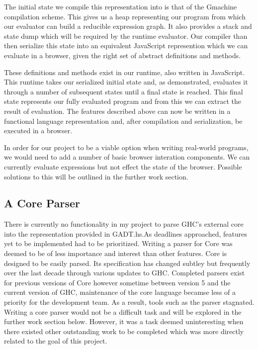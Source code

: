 The initial state we compile this representation into is that of
the Gmachine compilation scheme. This gives us a heap representing
our program from which our evaluator can build a reducible expression
graph. It also provides a stack and state dump which will be 
required by the runtime evaluator. Our compiler than then serialize
this state into an equivalent JavaScript represention which we can
evaluate in a browser, given the right set of abstract definitions
and methods.

These definitions and methods exist in our runtime, also written
in JavaScript. This runtime takes our serialized initial state
and, as demonstrated, evaluates it through a number of subsequent
states until a final state is reached. This final state represents
our fully evaluated program and from this we can extract the result
of evaluation. The features described above can now be written
in a functional language representation and, after compilation
and serialization, be executed in a browser. 

In order for our project to be a viable option when writing 
real-world programs, we would need to add a number of basic browser
interation components. We can currently evaluate expressions but
not effect the state of the browser. Possible solutions to this
will be outlined in the further work section.

\subsection{A Core Parser}
There is currently no functionality in my project to parse GHC's
external core into the representation provided in GADT.hs.As 
deadlines approached, features yet to be implemented had to be
prioritized. Writing a parser for Core was deemed to be of less
importance and interest than other features. Core is designed to
be easily parsed. Its specification has changed subtley but frequently
over the last decade through various updates to GHC. Completed
parsers exist for previous versions of Core however sometime between
version 5 and the current version of GHC, maintenance of the core
language becamse less of a priority for the development team. As
a result, tools such as the parser stagnated. Writing a core parser
would not be a difficult task and will be explored in the further
work section below. However, it was a task deemed uninteresting 
when there existed other outstanding work to be completed which was
more directly related to the goal of this project. 


